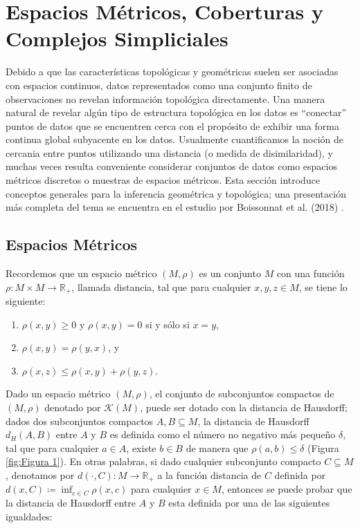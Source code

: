 \chapter{Espacios M\'etricos, Coberturas y Complejos Simpliciales}

Debido a que las caracter\'isticas topol\'ogicas y geom\'etricas suelen ser asociadas con espacios continuos,
datos representados como una conjunto finito de observaciones no revelan informaci\'on topol\'ogica
directamente. Una manera natural de revelar alg\'un tipo de estructura topol\'ogica en los datos
es ``conectar'' puntos de datos que se encuentren cerca con el prop\'osito de exhibir una forma continua
global subyacente en los datos. Usualmente cuantificamos la noci\'on de cercania entre puntos utilizando
una distancia (o medida de disimilaridad), y muchas veces resulta conveniente considerar conjuntos de datos
como espacios m\'etricos discretos o muestras de espacios m\'etricos. Esta secci\'on introduce conceptos
generales para la inferencia geom\'etrica y topol\'ogica; una presentaci\'on m\'as completa del tema se
encuentra en el estudio por Boissonnat et al. (2018) \cite{Boissonnat2018}.

\section*{Espacios M\'etricos}

Recordemos que un espacio m\'etrico $\left(M, \rho\right)$ es un conjunto $M$ con una funci\'on
$\rho: M \times M \rightarrow \mathbb{R}_{+}$, llamada distancia, tal que para cualquier $x, y, z \in M$,
se tiene lo siguiente:

\begin{enumerate}[label=\roman*)]
    \item $\rho\left(x, y\right) \geq 0$ y $\rho\left(x, y\right) = 0$ si y s\'olo si $x = y$,
    
    \item $\rho\left(x, y\right) = \rho\left(y, x\right)$, y
    
    \item $\rho\left(x, z\right) \leq \rho\left(x, y\right) + \rho\left(y, z\right)$.
    
\end{enumerate}

Dado un espacio m\'etrico $\left(M, \rho\right)$, el conjunto de subconjuntos compactos de
$\left(M, \rho\right)$ denotado por $\mathcal{K}\left(M\right)$, puede ser dotado
con la distancia de Hausdorff; dados dos subconjuntos compactos $A, B \subseteq M$,
la distancia de Hausdorff $d_{H}\left(A, B\right)$ entre $A$ y $B$ es
definida como el n\'umero no negativo m\'as peque\~{n}o $\delta$, tal que para cualquier $a \in A$, existe
$b \in B$ de manera que $\rho\left(a, b\right) \leq \delta$ (Figura \ref{fig:Figura 1}). En otras palabras,
si dado cualquier subconjunto compacto $C \subseteq M$, denotamos por $d\left(\cdot, C\right):
M\rightarrow\mathbb{R}_{+}$ a la funci\'on distancia de $C$ definida por
$d\left(x, C\right) \coloneqq \inf_{c\in C}\rho\left(x, c\right)$ para cualquier $x \in M$, entonces se
puede probar que la distancia de Hausdorff entre $A$ y $B$ esta definida por una de las siguientes
igualdades:

